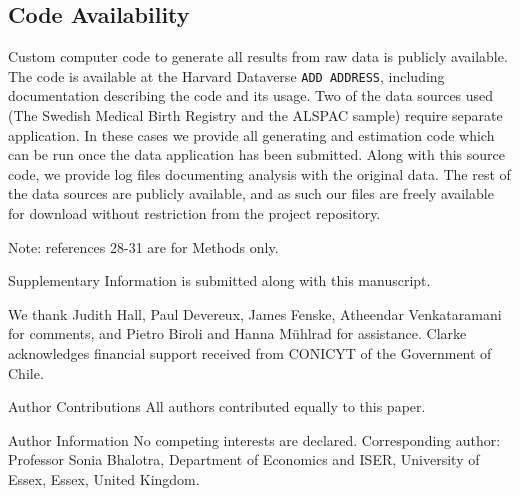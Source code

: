 \documentclass{nature}
\begin{document}
\begin{linenumbers}
\subsection{Code Availability}
Custom computer code to generate all results from raw data is publicly available. The code is available at the Harvard Dataverse \texttt{ADD ADDRESS}, including documentation describing the code and its usage.  Two of the data sources used (The Swedish Medical Birth Registry and the ALSPAC sample) require separate application.  In these cases we provide all generating and estimation code which can be run once the data application has been submitted.  Along with this source code, we provide log files documenting analysis with the original data.  The rest of the data sources are publicly available, and as such our files are freely available for download without restriction from the project repository.




\clearpage

Note: references 28-31 are for Methods only.

\clearpage
\begin{addendum}
 \item[Supplementary Information] is submitted along with this manuscript.
 \item We thank Judith Hall, Paul Devereux, James Fenske, Atheendar Venkataramani for comments, and Pietro Biroli and Hanna M\"uhlrad for assistance.  Clarke acknowledges financial support received from CONICYT of the Government of Chile.
 \item[Author Contributions] All authors contributed equally to this paper.
 \item[Author Information] No competing interests are declared.  Corresponding author: Professor Sonia Bhalotra, Department of Economics and ISER, University of Essex, Essex, United Kingdom.
\end{addendum}


\end{linenumbers}
\end{document}
